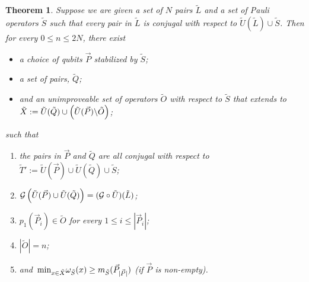 \documentclass[twocolumn,showpacs,preprintnumbers,amsmath,amssymb,nofootinbib,pra,floatfix]{revtex4-1}
\newtheorem{theorem}{Theorem}
\newcommand{\lst}{\vec}
\newcommand{\set}{\tilde}
\newcommand{\genfun}{\mathcal{G}}
\begin{document}
\begin{theorem}
Suppose we are given a set of $N$ pairs $\set L$ and a set of Pauli operators $\set S$ such that every pair in $\set L$ is conjugal with respect to $\set U(\set L)\cup\set S$.  Then for every $0\le n \le 2N$, there exist
\begin{itemize}
\item a choice of qubits $\lst P$ stabilized by $\set S$;
\item a set of pairs, $\set Q$;
\item and an unimproveable set of operators $\set O$ with respect to $\set S$ that extends to $\set X:=\set U(\set Q) \cup \paren{\set U(\lst P) \backslash \set O}$;
\end{itemize}
such that
\begin{enumerate}
\item \label{pairs are all conjugal to T} the pairs in $\lst P$ and $\set Q$ are all conjugal with respect to $\set T':=\set U(\lst P)\cup \set U(\set Q)\cup \set S$;
\item \label{P and Q generate the same set as L} $\genfun\paren{\set U(\lst P)\cup \set U(\set Q)}=(\genfun\circ\set U)(\set L)$;
\item \label{first members are all in O} $p_1(\lst P_i)\in \set O$ for every $1 \le i \le |\lst P_i|$;
\item \label{size of O matches arbitrarily chosen integer} $|\set O|=n$;
\item \label{operators in X are no worse than the best qubit in P} and $\min_{x\in\set X}\om_{\set S}(x)\ge m_{\set S}(\lst P_{|\lst P|})$ (if $\lst P$ is non-empty).
\end{enumerate}
\end{theorem}
\end{document}
